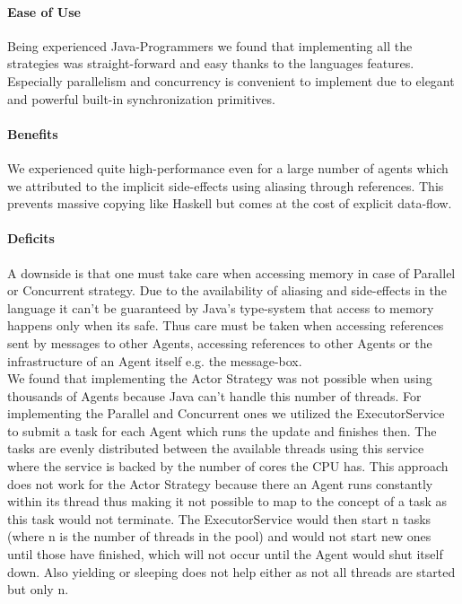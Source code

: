 \paragraph{Ease of Use}
Being experienced Java-Programmers we found that implementing all the strategies was straight-forward and easy thanks to the languages features. Especially parallelism and concurrency is convenient to implement due to elegant and powerful built-in synchronization primitives.

\paragraph{Benefits}
We experienced quite high-performance even for a large number of agents which we attributed to the implicit side-effects using aliasing through references. This prevents massive copying like Haskell but comes at the cost of explicit data-flow.

\paragraph{Deficits}
A downside is that one must take care when accessing memory in case of Parallel or Concurrent strategy. Due to the availability of aliasing and side-effects in the language it can't be guaranteed by Java's type-system that access to memory happens only when its safe. Thus care must be taken when accessing references sent by messages to other Agents, accessing references to other Agents or the infrastructure of an Agent itself e.g. the message-box. \\
We found that implementing the Actor Strategy was not possible when using thousands of Agents because Java can't handle this number of threads. For implementing the Parallel and Concurrent ones we utilized the ExecutorService to submit a task for each Agent which runs the update and finishes then. The tasks are evenly distributed between the available threads using this service where the service is backed by the number of cores the CPU has. This approach does not work for the Actor Strategy because there an Agent runs constantly within its thread thus making it not possible to map to the concept of a task as this task would not terminate. The ExecutorService would then start n tasks (where n is the number of threads in the pool) and would not start new ones until those have finished, which will not occur until the Agent would shut itself down. Also yielding or sleeping does not help either as not all threads are started but only n. 

